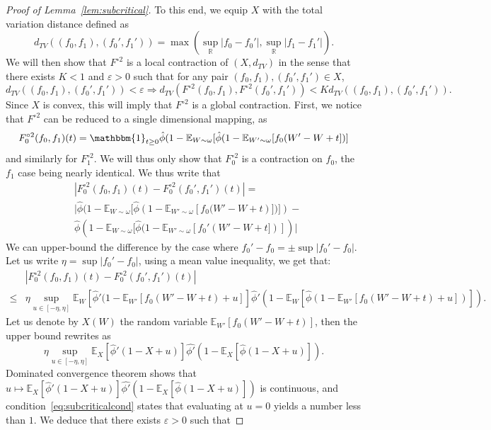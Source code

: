 \documentclass[11pt]{article}
\newcommand{\eps}{\varepsilon}
\begin{document}
\begin{proof}[Proof of Lemma~\ref{lem:subcritical}]
To this end, we equip $X$ with the total variation distance defined as 
\begin{equation}\label{def:TVfunc}
    d_{TV}((f_0,f_1),(f_0',f_1'))=\max( \sup_\mathbb{R} |f_0-f_0'|,\sup_\mathbb{R}|f_1-f_1'|  ).
\end{equation}
We will then show that $F^{\circ 2}$ is a local contraction of $(X,d_{TV})$ in the sense that there exists $K<1$ and $\eps>0$ such that for any pair $(f_0,f_1),(f_0',f_1') \in X$,
\[ d_{TV}((f_0,f_1),(f_0',f_1'))< \eps \Longrightarrow d_{TV}(F^{\circ 2}(f_0,f_1),F^{\circ 2}(f_0',f_1'))<K d_{TV}((f_0,f_1),(f_0',f_1')). \]
Since $X$ is convex, this will imply that $F^{\circ 2}$ is a global contraction.
First, we notice that $F^{\circ 2}$ can be reduced to a single dimensional mapping, as \[F^{\circ 2}_0(f_0,f_1)(t)=\mathbbm{1}_{t \geq 0} \hat{\phi}(1-\mathbb{E}_{W\sim \omega}[\hat{\phi}(1-\mathbb{E}_{W' \sim \omega}[f_0(W'-W+t])]\] and similarly for $F^{\circ 2}_1$.
We will thus only show that $F^{\circ 2}_0$ is a contraction on $f_0$, the $f_1$ case being nearly identical.
We thus write that
\begin{align*}
&|F^{\circ 2}_0(f_0,f_1)(t)-F^{\circ 2}_0(f_0',f_1')(t)|   = \\
&\bigg|\hat{\phi}(1-\mathbb{E}_{W\sim \omega}[\hat{\phi}\left(1-\mathbb{E}_{W' \sim \omega}\left[f_0(W'-W+t\right)])]\right) - \\ &\hat{\phi}\left(1-\mathbb{E}_{W\sim \omega}[\hat{\phi}(1-\mathbb{E}_{W' \sim \omega}\left[f_0'(W'-W+t])\right]\right)\bigg|
\end{align*}
We can upper-bound the difference by the case where $f_0'-f_0=\pm \sup |f_0'-f_0|$. Let us write $\eta=\sup |f_0'-f_0|$, using a mean value inequality, we get that:
\begin{align*}
    &|F^{\circ 2}_0(f_0,f_1)(t)-F^{\circ 2}_0(f_0',f_1')(t)| \\
    \leq &\eta \sup_{u \in [-\eta,\eta]} \mathbb{E}_W\left[\hat{\phi}'(1-\mathbb{E}_{W'}[f_0(W'-W+t)+u]\right]\hat{\phi}'\left(1-\mathbb{E}_W[\hat{\phi}(1-\mathbb{E}_{W'}[f_0(W'-W+t)+u])]\right).
\end{align*}
Let us denote by $X(W)$ the random variable $\mathbb{E}_{W'}[f_0(W'-W+t)]$, then the upper bound rewrites as
\[ \eta \sup_{u \in [-\eta,\eta]} \mathbb{E}_X \left[\hat{\phi}'(1-X+u) \right]\hat{\phi'}\left(1-\mathbb{E}_X \left[ \hat{\phi}(1-X+u)\right]\right). \]
Dominated convergence theorem shows that $u \mapsto \mathbb{E}_X \left[\hat{\phi}'(1-X+u) \right]\hat{\phi'}\left(1-\mathbb{E}_X \left[ \hat{\phi}(1-X+u)\right]\right)$ is continuous, and condition~\ref{eq:subcriticalcond} states that evaluating at $u=0$ yields a number less than $1$.  We deduce that there exists $\eps>0$ such that

\end{proof}
\end{document}
